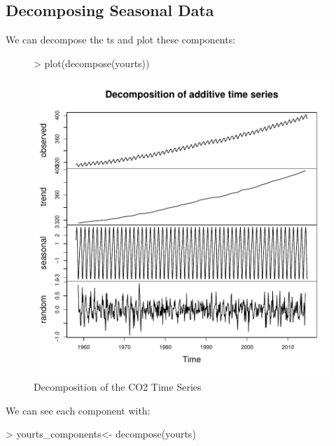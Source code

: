 \documentclass[11pt, a4paper]{article} %
\begin{document}
\subsection{Decomposing Seasonal Data}%
\noindent We can decompose the ts and plot these components:
\begin{figure}[H]
\centering
\begin{Schunk}
\begin{Sinput}
> plot(decompose(yourts))
\end{Sinput}
\end{Schunk}
\includegraphics{alles-decompose}
\caption{Decomposition of the CO2 Time Series}
\end{figure}
\noindent We can see each component with:
\begin{Schunk}
\begin{Sinput}
> yourts_components<- decompose(yourts)
\end{Sinput}
\end{Schunk}
\begin{Schunk}
\end{Schunk}
\end{document}
